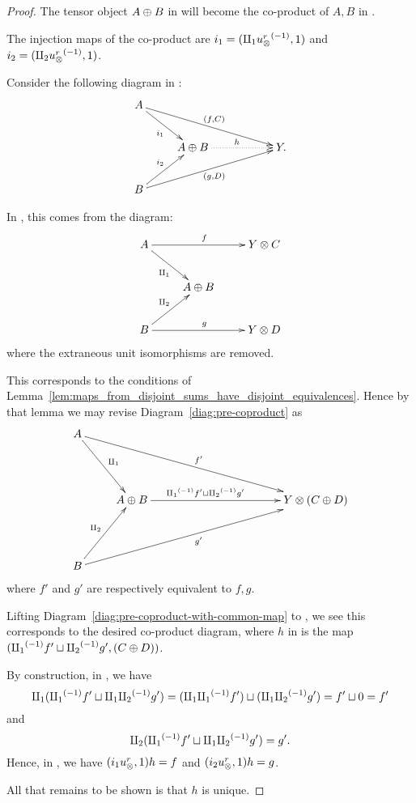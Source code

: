 \begin{proof}
  The tensor object $A\oplus B$ in \X will become the co-product of $A, B$ in \Xt.

  The injection maps of the co-product are $i_1 =(\amalg_{1} {u_{\otimes}^r}^{(-1)}, 1)$ and
  $i_2 = (\amalg_{2} {u_{\otimes}^r}^{(-1)}, 1)$.

  Consider the following diagram in \Xt:
  \[
    \xymatrix{
      A \ar[drrr]^{(f,C)} \ar[dr]_{i_1} \\
      & A\+B \ar@{.>}[rr]^h & & Y. \\
      B \ar[urrr]_{(g,D)} \ar[ur]^{i_2}
    }
  \]

  In \X, this comes from the diagram:
  \begin{equation}
    \xymatrix{
      A \ar[dr]_{\cpa} \ar[rr]^f && Y\*C\\
      & A\+B\\
      B \ar[ur]^{\cpb} \ar[rr]^g && Y\*D\\
    }\label{diag:pre-coproduct}
  \end{equation}
  where the extraneous unit isomorphisms are removed.

  This corresponds to the conditions of
  Lemma~\ref{lem:maps_from_disjoint_sums_have_disjoint_equivalences}. Hence by that lemma we may
  revise Diagram~\ref{diag:pre-coproduct} as
  \begin{equation}
    \xymatrix@R+20pt {
      A \ar[dr]^{\cpa} \ar[drrrrr]^{f'}\\
      &A\+B \ar[rrrr]^(.4){\icpa f' \djoin \icpb g'} &&&& Y\*(C\+D)\\
      B \ar[ur]^{\cpb} \ar[urrrrr]_{g'}\\
    }\label{diag:pre-coproduct-with-common-map}
  \end{equation}
  where $f'$ and $g'$ are respectively equivalent to $f,g$.

  Lifting Diagram~\ref{diag:pre-coproduct-with-common-map} to \X, we see this corresponds to the
  desired co-product diagram, where  $h$ in \Xt is the map $({\amalg_{1}}^{(-1)} f' \sqcup {\amalg_{2}}^{(-1)} g', (C\oplus D))$.

  By construction, in \X, we have
  \[
    \amalg_{1} ({\amalg_{1}}^{(-1)} f' \sqcup \amalg_{1}{\amalg_{2}}^{(-1)} g') = (\amalg_{1}{\amalg_{1}}^{(-1)} f') \sqcup (\amalg_{1}{\amalg_{2}}^{(-1)} g') = f' \sqcup 0 = f'
  \]
  and
  \[
    \amalg_{2} ({\amalg_{1}}^{(-1)} f' \sqcup \amalg_{1}{\amalg_{2}}^{(-1)} g') = g'.
  \]
  Hence, in \Xt, we have  $(i_1 u_{\otimes}^r, 1) h = f$ and $(i_2 u_{\otimes}^r, 1) h = g$.

  All that remains to be shown is that $h$ is unique.


\end{proof}
